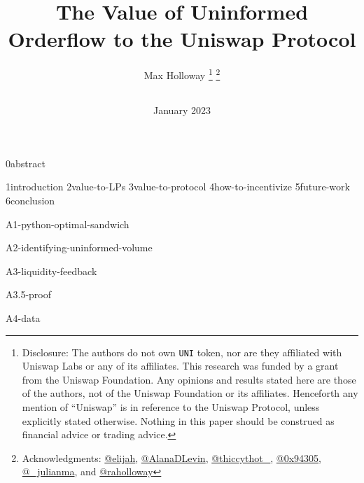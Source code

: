 \documentclass{article}
\title{The Value of Uninformed Orderflow to the Uniswap Protocol}
\author{
    Max Holloway \footnote{Disclosure: The authors do not own \texttt{UNI} token, nor are they affiliated with Uniswap Labs or any of its affiliates. This research was funded by a grant from the Uniswap Foundation. Any opinions and results stated here are those of the authors, not of the Uniswap Foundation or its affiliates. Henceforth any mention of ``Uniswap'' is in reference to the Uniswap Protocol, unless explicitly stated otherwise. Nothing in this paper should be construed as financial advice or trading advice.} \footnote{Acknowledgments: \href{https://twitter.com/eljhfx}{@elijah}, \href{https://twitter.com/AlanaDLevin}{@AlanaDLevin}, \href{https://twitter.com/thiccythot_}{@thiccythot\_}, \href{https://twitter.com/0x94305}{@0x94305}, \href{https://twitter.com/_julianma}{@\_julianma}, and \href{https://twitter.com/raholloway}{@raholloway} } \\
    \texttt{
        \href{mailto:max@xenophonlabs.com}{\color{black}{max@xenophonlabs.com}}
    } 
}
\date{January 2023}
\begin{document}
    \maketitle    
    {0abstract}
    \newpage
    
    {1introduction}
    {2value-to-LPs}
    {3value-to-protocol}
    {4how-to-incentivize}
    {5future-work}
    {6conclusion}
    
    \appendix
    \newpage
    {A1-python-optimal-sandwich}
    
    \newpage
    {A2-identifying-uninformed-volume}

    \newpage
    {A3-liquidity-feedback}

    \newpage
    {A3.5-proof}
    
    \newpage
    {A4-data}

    \clearpage
    \printbibliography
    
\end{document}
